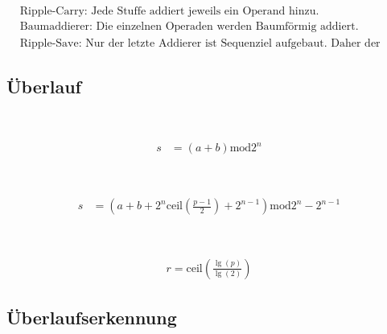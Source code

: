 \begin{boxshaded}
\begin{align*}
&\text{Ripple-Carry: Jede Stuffe addiert jeweils ein Operand hinzu.}\\
&\text{Baumaddierer: Die einzelnen Operaden werden Baumförmig addiert.}\\
&\text{Ripple-Save: Nur der letzte Addierer ist Sequenziel aufgebaut. Daher der Übertrag des Vorgängers wird beim nächsten Aufaddiert.}
\end{align*}
\end{boxshaded}

\subsection{Überlauf}

\begin{boxleft}
\\
\end{boxleft}\begin{boxrightshaded}
\begin{align*}
s&=\left(a+b\right)\text{mod} 2^n
\end{align*}
\end{boxrightshaded}

\begin{boxleft}
\\
\end{boxleft}\begin{boxrightshaded}
\begin{align*}
s&=\left(a+b+2^n\text{ceil}\left(\frac{p-1}{2}\right)+2^{n-1}\right)\text{mod} 2^n-2^{n-1}
\end{align*}
\end{boxrightshaded}

\begin{boxleft}
\\
\end{boxleft}\begin{boxrightshaded}
\begin{align*}
r=\text{ceil}\left(\frac{\lg\left(p\right)}{\lg\left(2\right)}\right)
\end{align*}
\end{boxrightshaded}


\subsection{Überlaufserkennung}


